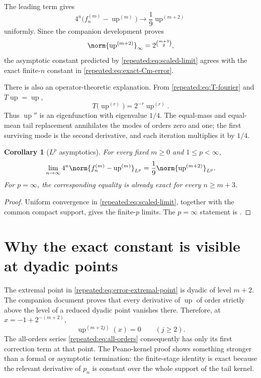 \documentclass[11pt,oneside]{article}
\newtheorem{corollary}[theorem]{Corollary}
\theoremstyle{definition}
\theoremstyle{remark}
\newcommand{\Up}{\operatorname{up}}
\begin{document}
The leading term gives
\begin{equation}
 4^n\bigl(f_n^{(m)}-\Up^{(m)}\bigr)
 \longrightarrow\frac19\Up^{(m+2)}                       \label{repeated:eq:scaled-limit}
\end{equation}
uniformly.  Since the companion development proves
\begin{equation}
 \norm{\Up^{(m+2)}}_\infty=2^{\binom{m+3}{2}},             \label{repeated:eq:up-sharp-bound}
\end{equation}
the asymptotic constant predicted by \eqref{repeated:eq:scaled-limit} agrees with the exact finite-$n$
constant in \eqref{repeated:eq:exact-Cm-error}.

There is also an operator-theoretic explanation.  From \eqref{repeated:eq:T-fourier} and $T\Up=\Up$,
\begin{equation}
 T\bigl(\Up^{(r)}\bigr)=2^{-r}\Up^{(r)}.                   \label{repeated:eq:T-eigenfunctions}
\end{equation}
Thus $\Up''$ is an eigenfunction with eigenvalue $1/4$.  The equal-mass and equal-mean tail
replacement annihilates the modes of orders zero and one; the first surviving mode is the
second derivative, and each iteration multiplies it by $1/4$.

\begin{corollary}[$L^p$ asymptotics]
\label{repeated:cor:Lp}
For every fixed $m\ge0$ and $1\le p<\infty$,
\begin{equation}
 \lim_{n\to\infty}4^n\norm{f_n^{(m)}-\Up^{(m)}}_{L^p}
 =\frac19\norm{\Up^{(m+2)}}_{L^p}.                         \label{repeated:eq:Lp-asymptotic}
\end{equation}
For $p=\infty$, the corresponding equality is already exact for every $n\ge m+3$.
\end{corollary}

\begin{proof}
Uniform convergence in \eqref{repeated:eq:scaled-limit}, together with the common compact support,
gives the finite-$p$ limits.  The $p=\infty$ statement is .
\end{proof}

\section{Why the exact constant is visible at dyadic points}
\label{repeated:sec:dyadic-extrema}

The extremal point in \eqref{repeated:eq:error-extremal-point} is dyadic of level $m+2$.  The companion
document proves that every derivative of $\Up$ of order strictly above the level of a reduced
dyadic point vanishes there.  Therefore, at
$x=-1+2^{-(m+2)}$,
\begin{equation}
 \Up^{(m+2j)}(x)=0\qquad(j\ge2).                           \label{repeated:eq:high-derivatives-vanish}
\end{equation}
The all-orders series \eqref{repeated:eq:all-orders} consequently has only its first correction term at
that point.  The Peano-kernel proof shows something stronger than a formal or asymptotic
termination: the finite-stage identity is exact because the relevant derivative of $p_n$ is
constant over the whole support of the tail kernel.
\end{document}
